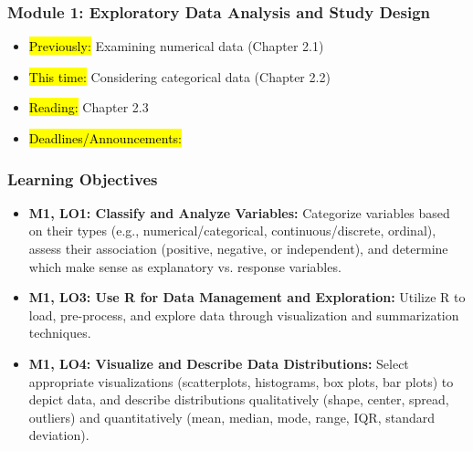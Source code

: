 
\begin{frame}
    \frametitle{Module 1: Exploratory Data Analysis and Study Design}
    \begin{itemize}
        \item \hl{Previously: }Examining numerical data (Chapter 2.1)
        \item \hl{This time: }Considering categorical data (Chapter 2.2)
        \item \hl{Reading: }Chapter 2.3
        \item \hl{Deadlines/Announcements: }
    \end{itemize}

\end{frame}

\begin{frame}
    \frametitle{Learning Objectives}
    \begin{itemize}
        \item \textbf{M1, LO1: Classify and Analyze Variables:} Categorize variables based on their types (e.g., numerical/categorical, continuous/discrete, ordinal), assess their association (positive, negative, or independent), and determine which make sense as explanatory vs. response variables.
        \item \textbf{M1, LO3: Use R for Data Management and Exploration:} Utilize R to load, pre-process, and explore data through visualization and summarization techniques.
        \item \textbf{M1, LO4: Visualize and Describe Data Distributions:} Select appropriate visualizations (scatterplots, histograms, box plots, bar plots) to depict data, and describe distributions qualitatively (shape, center, spread, outliers) and quantitatively (mean, median, mode, range, IQR, standard deviation).
    \end{itemize}
\end{frame}
